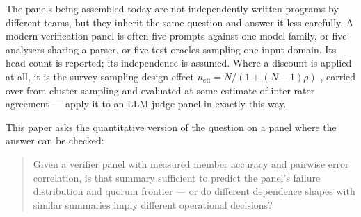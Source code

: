 \documentclass[11pt,a4paper]{article}
\newcommand{\neff}{n_{\mathrm{eff}}}
\begin{document}
The panels being assembled today are not independently written programs by
different teams, but they inherit the same question and answer it less carefully.
A modern verification panel is often five prompts against one model family, or
five analysers sharing a parser, or five test oracles sampling one input domain.
Its head count is reported; its independence is assumed. Where a discount is
applied at all, it is the survey-sampling design effect
$\neff = N/(1 + (N-1)\rho)$ \citep{kish1965}, carried over from cluster sampling
and evaluated at some estimate of inter-rater agreement ---
\citet{kohli2026} apply it to an LLM-judge panel in exactly this way.

This paper asks the quantitative version of the question on a panel where the
answer can be checked:

\begin{quote}
Given a verifier panel with measured member accuracy and pairwise error
correlation, is that summary sufficient to predict the panel's failure
distribution and quorum frontier --- or do different dependence shapes with
similar summaries imply different operational decisions?
\end{quote}
\end{document}
